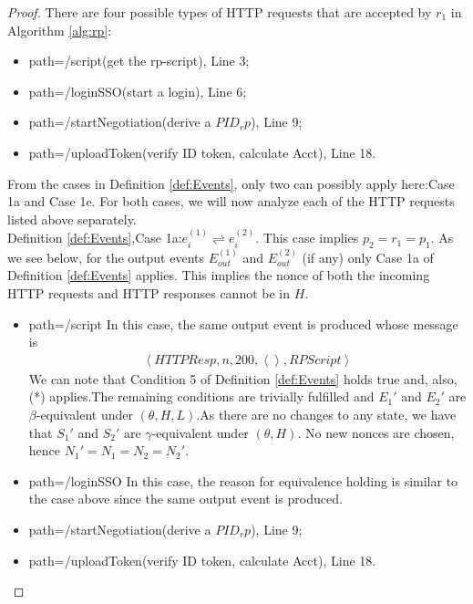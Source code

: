 \documentclass[letterpaper,onecolumn,10pt]{article}
\begin{document}
\begin{proof}
  There are four possible types of HTTP requests that are accepted by $r_1$ in Algorithm \ref{alg:rp}:
  \begin{itemize}
    \item path=/script(get the rp-script), Line 3;
    \item path=/loginSSO(start a login), Line 6;
    \item path=/startNegotiation(derive a $PID_rp$), Line 9;
    \item path=/uploadToken(verify ID token, calculate Acct), Line 18.
  \end{itemize}
  \par From the cases in Definition \ref{def:Events}, only two can possibly apply here:Case 1a and Case 1e. For both cases, we will now analyze each of the HTTP requests listed above separately.\\
  Definition \ref{def:Events},Case 1a:$e_i^{(1)}\rightleftharpoons e_i^{(2)}$. This case implies $p_2=r_1=p_1$. As we see below, for the output events $E_{out}^{(1)}$ and $E_{out}^{(2)}$ (if any) only Case 1a of Definition \ref{def:Events} applies. This implies the nonce of both the incoming HTTP requests and HTTP responses cannot be in $H$.
  \begin{itemize}
    \item path=/script In this case, the same output event is produced whose message is 
    \begin{equation}
      \begin{aligned}
        \left\langle HTTPResp,n,200,\left\langle\right\rangle,RPScript\right\rangle
      \end{aligned}
    \end{equation}
    We can note that Condition 5 of Definition \ref{def:Events} holds true and, also, (*) applies.The remaining conditions are trivially fulfilled and $E_1\prime$ and $E_2\prime$ are $\beta$-equivalent under $(\theta,H,L)$.As there are no changes to any state, we have that $S_1\prime$ and $S_2\prime$ are $\gamma$-equivalent under $(\theta,H)$. No new nonces are chosen, hence $N_1\prime=N_1=N_2=N_2\prime$.
    \item path=/loginSSO In this case, the reason for equivalence holding is similar to the case above since the same output event is produced.
    \item path=/startNegotiation(derive a $PID_rp$), Line 9;
    \item path=/uploadToken(verify ID token, calculate Acct), Line 18.
  \end{itemize}
\end{proof}
\end{document}
